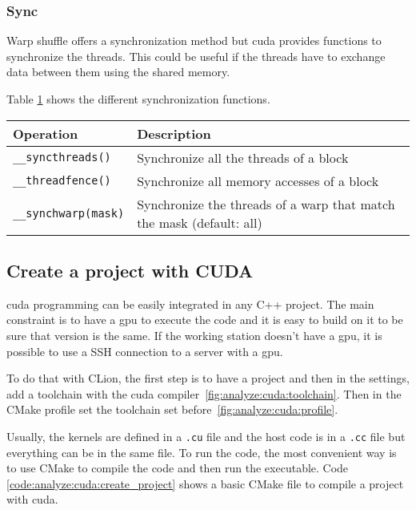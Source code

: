 \subsubsection{Sync}
\label{ch:analyze:cuda:synchronization:sync}

Warp shuffle offers a synchronization method but \acrshort{cuda} provides
functions to synchronize the threads.
This could be useful if the threads have to exchange data between them using
the shared memory.

Table \ref{tab:analyze:cuda:synchronization:sync} shows the different
synchronization functions.

\begin{table}[ht]
    \centering
    \begin{tabular}{|m{}|m{}|}
        \hline
        \textbf{Operation} & \textbf{Description} \\
        \hline
        \texttt{\_\_syncthreads()} & Synchronize all the threads of a block\\
        \hline
        \texttt{\_\_threadfence()} & Synchronize all memory accesses of a block\\
        \hline
        \texttt{\_\_synchwarp(mask)} & Synchronize the threads of a warp that match the mask (default: all)\\
        \hline
    \end{tabular}
    \label{tab:analyze:cuda:synchronization:sync}
\end{table}


\subsection{Create a project with CUDA}
\label{ch:analyze:cuda:create_project}

\acrshort{cuda} programming can be easily integrated in any C++ project.
The main constraint is to have a \acrshort{gpu} to execute the code and it is
easy to build on it to be sure that version is the same.
If the working station doesn't have a \acrshort{gpu}, it is possible to use a
SSH connection to a server with a \acrshort{gpu}.

To do that with CLion, the first step is to have a project and then in the
settings, add a toolchain with the \acrshort{cuda} compiler~\ref{fig:analyze:cuda:toolchain}.
Then in the CMake profile set the toolchain set before~\ref{fig:analyze:cuda:profile}.

Usually, the kernels are defined in a \texttt{.cu} file and the host code is in
a \texttt{.cc} file but everything can be in the same file.
To run the code, the most convenient way is to use CMake to compile the code
and then run the executable.
Code \ref{code:analyze:cuda:create_project} shows a basic CMake file to
compile a project with \acrshort{cuda}.

